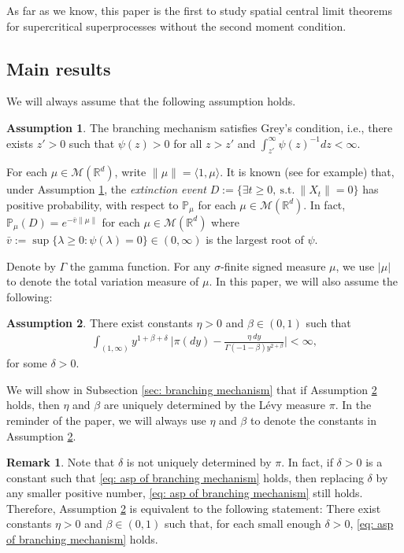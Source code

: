 \documentclass[12pt,a4paper]{amsart}
\theoremstyle{plain}
\theoremstyle{definition}
\newtheorem{rem}[thm]{Remark}
\newtheorem{asp}{Assumption}
\numberwithin{equation}{section}
\begin{document}
As far as we know, this paper is the first to study spatial central limit theorems for supercritical superprocesses without the second moment condition.


\subsection{Main results}
\label{sec:I:R}
We will always assume that the following assumption holds.
\begin{asp}
  \label{asp: Greys condition}
  The branching mechanism satisfies Grey's condition, i.e., there exists $z' > 0$ such that $\psi(z) > 0$ for all $z>z'$ and  $\int_{z'}^\infty \psi(z)^{-1}dz < \infty$.
\end{asp}
For each $\mu \in \mathcal M(\mathbb R^d)$, write $\|\mu\| = \langle 1, \mu\rangle$.
It is known (see \cite[Theorems 12.5 \& 12.7]{Kyprianou2014Fluctuations} for example) that, under Assumption \ref{asp: Greys condition}, the \emph{extinction event} $D :=\{\exists t\geq 0,~\text{s.t.}~ \|X_t\| =0 \}$ has positive probability, with respect to $\mathbb P_\mu$ for each  $\mu \in \mathcal M(\mathbb R^d)$.
In fact, $ \mathbb{P}_{\mu} (D) = e^{-\bar v \|\mu\|}$ for each $\mu\in \mathcal M(\mathbb R^d)$ where $ \bar v := \sup\{\lambda \geq 0: \psi(\lambda) = 0\} \in (0,\infty) $ is the largest root of $\psi$.

Denote by $\Gamma$ the gamma function.
For any $\sigma$-finite signed measure $\mu$, we use $|\mu|$ to denote the total variation measure of $\mu$.
In this paper, we will also assume the following:
\begin{asp}
  \label{asp: branching mechanism}
  There exist constants $\eta > 0$ and $\beta \in (0,1)$ such that
  \begin{align}
    \label{eq: asp of branching mechanism}
    \int_{(1,\infty)}y^{1+\beta +\delta}~\Big|\pi(dy)-\frac{\eta~dy}{\Gamma(-1-\beta)y^{2+\beta}}\Big| <\infty,
  \end{align}
	for some $\delta > 0$.
\end{asp}
We will show in Subsection \ref{sec: branching mechanism} that if Assumption \ref{asp: branching mechanism} holds, then $\eta$ and $\beta$ are uniquely determined by the L\'evy measure $\pi$.
In the reminder of the paper, we will always use $\eta$ and $\beta$ to denote the constants in Assumption  \ref{asp: branching mechanism}.

\begin{rem}
  \label{rem: small enough delta}
	Note that $\delta$ is not uniquely determined by $\pi$.
	In fact, if $\delta>0$ is a constant such that \eqref{eq: asp of branching mechanism} holds, then replacing $\delta$ by any smaller positive number, \eqref{eq: asp of branching mechanism} still holds.
	Therefore, Assumption \ref{asp: branching mechanism} is equivalent to the following statement:
	There exist constants $\eta > 0$ and $\beta \in (0,1)$ such that, for each small enough $\delta>0$, \eqref{eq: asp of branching mechanism} holds.
\end{rem}
\end{document}
